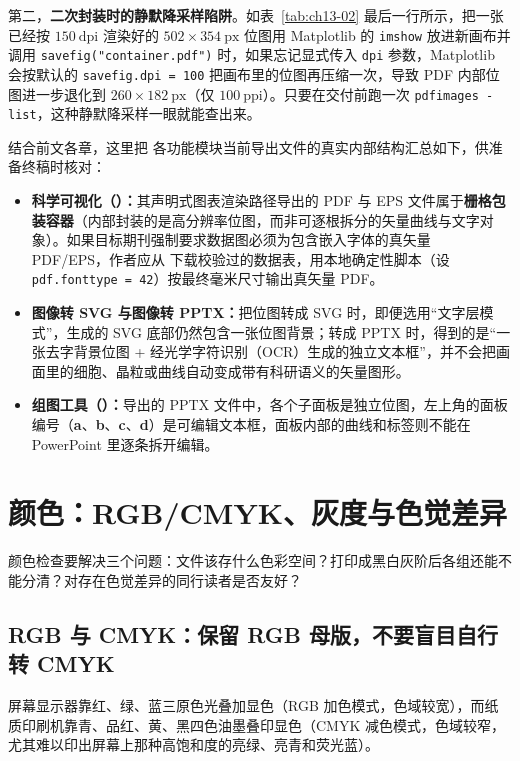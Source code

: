 第二，\textbf{二次封装时的静默降采样陷阱}。如表~\ref{tab:ch13-02} 最后一行所示，把一张已经按 $150\ \text{dpi}$ 渲染好的 $502 \times 354\ \text{px}$ 位图用 Matplotlib 的 \texttt{imshow} 放进新画布并调用 \texttt{savefig("container.pdf")} 时，如果忘记显式传入 \texttt{dpi} 参数，Matplotlib 会按默认的 \texttt{savefig.dpi = 100} 把画布里的位图再压缩一次，导致 PDF 内部位图进一步退化到 $260 \times 182\ \text{px}$（仅 $100\ \text{ppi}$）。只要在交付前跑一次 \texttt{pdfimages -list}，这种静默降采样一眼就能查出来。

结合前文各章，这里把 \scidraw{} 各功能模块当前导出文件的真实内部结构汇总如下，供准备终稿时核对：
\begin{itemize}
\item \textbf{科学可视化（）：}其声明式图表渲染路径导出的 PDF 与 EPS 文件属于\textbf{栅格包装容器}（内部封装的是高分辨率位图，而非可逐根拆分的矢量曲线与文字对象）。如果目标期刊强制要求数据图必须为包含嵌入字体的真矢量 PDF/EPS，作者应从  下载校验过的数据表，用本地确定性脚本（设 \texttt{pdf.fonttype = 42}）按最终毫米尺寸输出真矢量 PDF。
\item \textbf{图像转 SVG 与图像转 PPTX：}把位图转成 SVG 时，即便选用“文字层模式”，生成的 SVG 底部仍然包含一张位图背景；转成 PPTX 时，得到的是“一张去字背景位图 + 经光学字符识别（OCR）生成的独立文本框”，并不会把画面里的细胞、晶粒或曲线自动变成带有科研语义的矢量图形。
\item \textbf{组图工具（）：}导出的 PPTX 文件中，各个子面板是独立位图，左上角的面板编号（\textbf{a}、\textbf{b}、\textbf{c}、\textbf{d}）是可编辑文本框，面板内部的曲线和标签则不能在 PowerPoint 里逐条拆开编辑。
\end{itemize}

\section{颜色：RGB/CMYK、灰度与色觉差异}

颜色检查要解决三个问题：文件该存什么色彩空间？打印成黑白灰阶后各组还能不能分清？对存在色觉差异的同行读者是否友好？

\subsection*{RGB 与 CMYK：保留 RGB 母版，不要盲目自行转 CMYK}

屏幕显示器靠红、绿、蓝三原色光叠加显色（RGB 加色模式，色域较宽），而纸质印刷机靠青、品红、黄、黑四色油墨叠印显色（CMYK 减色模式，色域较窄，尤其难以印出屏幕上那种高饱和度的亮绿、亮青和荧光蓝）。

